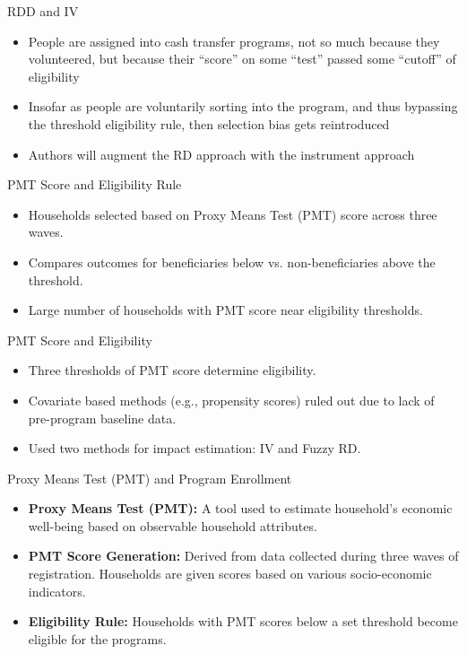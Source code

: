 \documentclass{beamer}
\begin{document}
\begin{frame}{RDD and IV}
\begin{itemize}
\item People are assigned into cash transfer programs, not so much because they volunteered, but because their ``score'' on some ``test'' passed some ``cutoff'' of eligibility
\item Insofar as people are voluntarily sorting into the program, and thus bypassing the threshold eligibility rule, then selection bias gets reintroduced
\item Authors will augment the RD approach with the instrument approach
\end{itemize}
\end{frame}

\begin{frame}{PMT Score and Eligibility Rule}
\begin{itemize}
\item Households selected based on Proxy Means Test (PMT) score across three waves.
\item Compares outcomes for beneficiaries below vs. non-beneficiaries above the threshold.
\item Large number of households with PMT score near eligibility thresholds.
\end{itemize}
\end{frame}


\begin{frame}{PMT Score and Eligibility}
\begin{itemize}
\item Three thresholds of PMT score determine eligibility.
\item Covariate based methods (e.g., propensity scores) ruled out due to lack of pre-program baseline data.
\item Used two methods for impact estimation: IV and Fuzzy RD.
\end{itemize}
\end{frame}

\begin{frame}{Proxy Means Test (PMT) and Program Enrollment}
\begin{itemize}
    \item \textbf{Proxy Means Test (PMT):} A tool used to estimate household's economic well-being based on observable household attributes. 
    \item \textbf{PMT Score Generation:} Derived from data collected during three waves of registration. Households are given scores based on various socio-economic indicators.
    \item \textbf{Eligibility Rule:} Households with PMT scores below a set threshold become eligible for the programs.
\end{itemize}
\end{frame}
\end{document}
